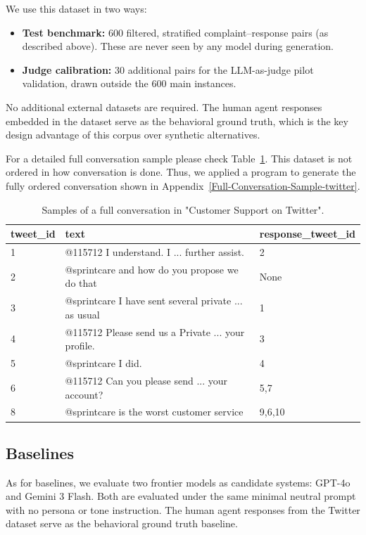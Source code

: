 \documentclass[11pt]{article}
\begin{document}
We use this dataset in two ways:

\begin{itemize}
	\item \textbf{Test benchmark:} 600 filtered, stratified complaint--response pairs (as described above). These are never seen by any model during generation.
	\item \textbf{Judge calibration:} 30 additional pairs for the LLM-as-judge pilot validation, drawn outside the 600 main instances.
\end{itemize}

No additional external datasets are required. The human agent responses embedded in the dataset serve as the behavioral ground truth, which is the key design advantage of this corpus over synthetic alternatives.

For a detailed full conversation sample please check Table~\ref{full-conversation-sample}. This dataset is not ordered in how conversation is done. Thus, we applied a program to generate the fully ordered conversation shown in Appendix~\ref{Full-Conversation-Sample-twitter}.

\begin{table}
	\centering
	\begin{tabular}{lll}
		\hline
		\textbf{tweet\_id} & \textbf{text} & \textbf{response\_tweet\_id}\\
		\hline
		1 & @115712 I understand. I ... further assist. & 2 \\
		2 & @sprintcare and how do you propose we do that & None \\
		3 & @sprintcare I have sent several private ... as usual & 1 \\
		4 & @115712 Please send us a Private ... your profile. & 3 \\
		5 & @sprintcare I did. & 4 \\
		6 & @115712 Can you please send ... your account? & 5,7 \\
		8 & @sprintcare is the worst customer service & 9,6,10 \\
		\hline
	\end{tabular}
	\caption{\label{full-conversation-sample}
		Samples of a full conversation in "Customer Support on Twitter"\citep{stuart_axelbrooke_2017}. 
	}
\end{table}

\subsection{Baselines}
As for baselines, we evaluate two frontier models as candidate systems: GPT-4o and Gemini 3 Flash. Both are evaluated under the same minimal neutral prompt with no persona or tone instruction. The human agent responses from the Twitter dataset serve as the behavioral ground truth baseline.
\end{document}
